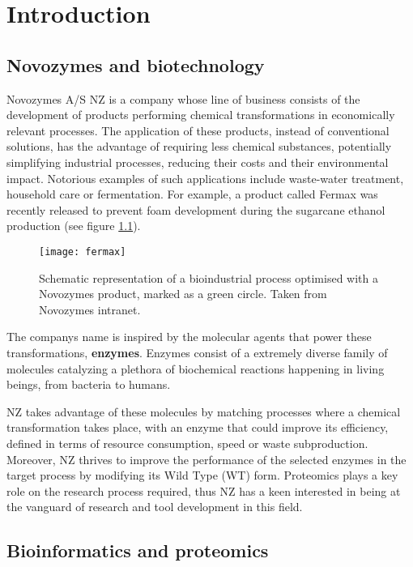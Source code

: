 \chapter{Introduction}
\label{chap:introduction}



\section{Novozymes and biotechnology}


Novozymes A/S \ac{NZ} is a company whose line of business consists of the development of products performing chemical transformations in economically relevant processes. The application of these products, instead of conventional solutions, has the advantage of requiring less chemical substances, potentially simplifying industrial processes, reducing their costs and their environmental impact. Notorious examples of such applications include waste-water treatment, household care or fermentation. For example, a product called Fermax was recently released to prevent foam development during the sugarcane ethanol production (see figure \ref{fig:ethanol}).

\begin{figure}[!h]
\centering
  \texttt{[image: fermax]}
\caption[Example of bioprocess optimised by Novozymes]{Schematic representation of a bioindustrial process optimised with a Novozymes product, marked as a green circle. Taken from Novozymes intranet.}
\label{fig:ethanol}
\end{figure}

The company\textquotesingle s name is inspired by the molecular agents that power these transformations, \textbf{enzymes}. Enzymes consist of a extremely diverse family of molecules catalyzing a plethora of biochemical reactions happening in living beings, from bacteria to humans. 

\ac{NZ} takes advantage of these molecules by matching processes where a chemical transformation takes place, with an enzyme that could improve its efficiency, defined in terms of resource consumption, speed or waste subproduction. Moreover, \ac{NZ} thrives to improve the performance of the selected enzymes in the target process by modifying its Wild Type (WT) form. Proteomics plays a key role on the research process required, thus \ac{NZ} has a keen interested in being at the vanguard of research and tool development in this field.

\section{Bioinformatics and proteomics}

